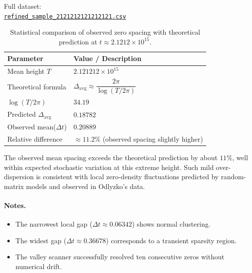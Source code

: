 \documentclass[11pt,a4paper]{article}
\begin{document}
\noindent
Full dataset: \\
\href{https://github.com/zjore/z-research/blob/main/datasets/refined_sample_2121212121212121.csv}{\texttt{refined\_sample\_2121212121212121.csv}}

\begin{table}[H]
\centering
\caption{Statistical comparison of observed zero spacing with theoretical prediction at $t \approx 2.1212\times10^{15}$.}
\begin{tabular}{ll}
\hline
\textbf{Parameter} & \textbf{Value / Description} \\
\hline
Mean height $T$ & $2.121212\times10^{15}$ \\
Theoretical formula & $\Delta_{\mathrm{avg}} \approx \dfrac{2\pi}{\log(T / 2\pi)}$ \\
$\log(T / 2\pi)$ & $34.19$ \\
Predicted $\Delta_{\mathrm{avg}}$ & $0.18782$ \\
Observed mean($\Delta t$) & $0.20889$ \\
Relative difference & $\approx 11.2\%$ (observed spacing slightly higher) \\
\hline
\end{tabular}
\label{tab:spacing_comparison_2121212121212121}
\end{table}

\noindent
The observed mean spacing exceeds the theoretical prediction by about $11\%$, well within expected stochastic variation at this extreme height. Such mild over-dispersion is consistent with local zero-density fluctuations predicted by random-matrix models and observed in Odlyzko’s data.

\paragraph{Notes.}
\begin{itemize}
\item The narrowest local gap ($\Delta t \approx 0.06342$) shows normal clustering.
\item The widest gap ($\Delta t \approx 0.36678$) corresponds to a transient sparsity region.
\item The valley scanner successfully resolved ten consecutive zeros without numerical drift.
\end{itemize}
\end{document}

